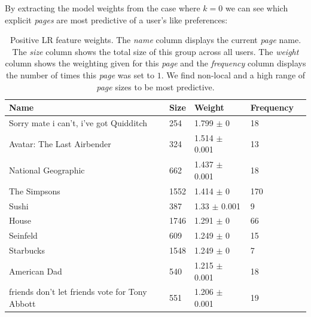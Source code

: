 By extracting the model weights from the case where $k=0$ we can see which explicit \emph{pages} are most predictive of a user's like preferences:
\begin{table}[h]
\begin{minipage}[b]{1.0\textwidth}
\centering
  \begin{tabular}{|l|l|l|l|l|} %
  \hline
  \textbf{Name} & \textbf{Size} & \textbf{Weight} & \textbf{Frequency} \\ \hline
\small{Sorry mate i can't, i've got Quidditch}  & 254 & 1.799 $\pm$ 0 & 18 \\ \hline
\small{Avatar: The Last Airbender}  & 324 & 1.514 $\pm$ 0.001 & 13 \\ \hline
\small{National Geographic}  & 662 & 1.437 $\pm$ 0.001 & 18 \\ \hline
\small{The Simpsons}  & 1552 & 1.414 $\pm$ 0 & 170 \\ \hline
\small{Sushi}  & 387 & 1.33 $\pm$ 0.001 & 9 \\ \hline
\small{House}  & 1746 & 1.291 $\pm$ 0 & 66 \\ \hline
\small{Seinfeld}  & 609 & 1.249 $\pm$ 0 & 15 \\ \hline
\small{Starbucks}  & 1548 & 1.249 $\pm$ 0 & 7 \\ \hline
\small{American Dad}  & 540 & 1.215 $\pm$ 0.001 & 18 \\ \hline
\small{friends don't let friends vote for Tony Abbott}  & 551 & 1.206 $\pm$ 0.001 & 19 \\ \hline
  \end{tabular}
 \caption{Positive LR feature weights. The \emph{name} column displays the current \emph{page} name.
  The \emph{size} column shows the total size of this group across all users.
  The \emph{weight} column shows the weighting given for this \emph{page} and the \emph{frequency} column displays the number of times 
  this \emph{page} was set to $1$. We find non-local and a high range of \emph{page} sizes to be most predictive.}
\end{minipage}
\end{table}

